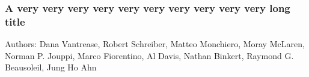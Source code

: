 \documentclass[../template.tex]{subfiles}
\begin{document}
\blindtext

\subsubsection{A very very very very very very very very very very long title \texorpdfstring{\hyperref[tab:literature]{\footnotesize \hfill{}}}{}}
\label{lit:labelOfYourSubsubsection5}		%
{
	\tiny
	Authors: Dana Vantrease, Robert Schreiber, Matteo Monchiero, Moray McLaren, Norman P. Jouppi, Marco Fiorentino, Al Davis, Nathan Binkert, Raymond G. Beausoleil, Jung Ho Ahn \cite{Something}
	\par  %
}

\cite{Pan, Something, HK, Boney96}
\blindtext

\end{document}
